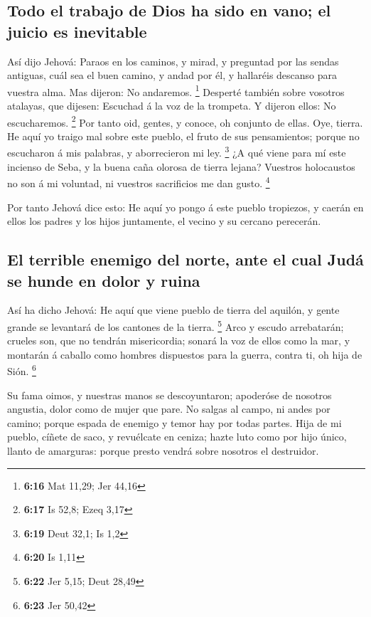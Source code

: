 \hypertarget{todo-el-trabajo-de-dios-ha-sido-en-vano-el-juicio-es-inevitable}{%
\subsection{Todo el trabajo de Dios ha sido en vano; el juicio es
inevitable}\label{todo-el-trabajo-de-dios-ha-sido-en-vano-el-juicio-es-inevitable}}

 Así dijo Jehová: Paraos en los caminos, y mirad, y
preguntad por las sendas antiguas, cuál sea el buen camino, y andad por
él, y hallaréis descanso para vuestra alma. Mas dijeron: No andaremos.
\footnote{\textbf{6:16} Mat 11,29; Jer 44,16}  Desperté
también sobre vosotros atalayas, que dijesen: Escuchad á la voz de la
trompeta. Y dijeron ellos: No escucharemos. \footnote{\textbf{6:17} Is
  52,8; Ezeq 3,17}  Por tanto oid, gentes, y conoce, oh
conjunto de ellas.  Oye, tierra. He aquí yo traigo mal
sobre este pueblo, el fruto de sus pensamientos; porque no escucharon á
mis palabras, y aborrecieron mi ley. \footnote{\textbf{6:19} Deut 32,1;
  Is 1,2}  ¿A qué viene para mí este incienso de Seba, y
la buena caña olorosa de tierra lejana? Vuestros holocaustos no son á mi
voluntad, ni vuestros sacrificios me dan gusto. \footnote{\textbf{6:20}
  Is 1,11}

 Por tanto Jehová dice esto: He aquí yo pongo á este
pueblo tropiezos, y caerán en ellos los padres y los hijos juntamente,
el vecino y su cercano perecerán.

\hypertarget{el-terrible-enemigo-del-norte-ante-el-cual-juduxe1-se-hunde-en-dolor-y-ruina}{%
\subsection{El terrible enemigo del norte, ante el cual Judá se hunde en
dolor y
ruina}\label{el-terrible-enemigo-del-norte-ante-el-cual-juduxe1-se-hunde-en-dolor-y-ruina}}

 Así ha dicho Jehová: He aquí que viene pueblo de tierra
del aquilón, y gente grande se levantará de los cantones de la tierra.
\footnote{\textbf{6:22} Jer 5,15; Deut 28,49}  Arco y
escudo arrebatarán; crueles son, que no tendrán misericordia; sonará la
voz de ellos como la mar, y montarán á caballo como hombres dispuestos
para la guerra, contra ti, oh hija de Sión. \footnote{\textbf{6:23} Jer
  50,42}

 Su fama oimos, y nuestras manos se descoyuntaron;
apoderóse de nosotros angustia, dolor como de mujer que pare.
 No salgas al campo, ni andes por camino; porque espada
de enemigo y temor hay por todas partes.  Hija de mi
pueblo, cíñete de saco, y revuélcate en ceniza; hazte luto como por hijo
único, llanto de amarguras: porque presto vendrá sobre nosotros el
destruidor.

